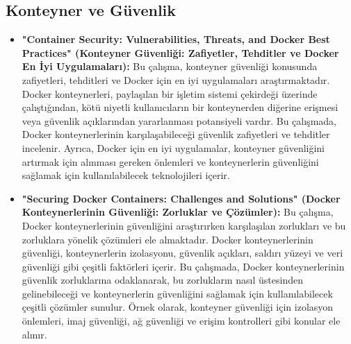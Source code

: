 \subsection{Konteyner ve Güvenlik}
\begin{itemize}
\item \textbf{ "Container Security: Vulnerabilities, Threats, and Docker Best Practices" (Konteyner Güvenliği: Zafiyetler, Tehditler ve Docker En İyi Uygulamaları):}
Bu çalışma, konteyner güvenliği konusunda zafiyetleri, tehditleri ve Docker için en iyi uygulamaları araştırmaktadır. Docker konteynerleri, paylaşılan bir işletim sistemi çekirdeği üzerinde çalıştığından, kötü niyetli kullanıcıların bir konteynerden diğerine erişmesi veya güvenlik açıklarından yararlanması potansiyeli vardır. Bu çalışmada, Docker konteynerlerinin karşılaşabileceği güvenlik zafiyetleri ve tehditler incelenir. Ayrıca, Docker için en iyi uygulamalar, konteyner güvenliğini artırmak için alınması gereken önlemleri ve konteynerlerin güvenliğini sağlamak için kullanılabilecek teknolojileri içerir.\\
\item \textbf{"Securing Docker Containers: Challenges and Solutions" (Docker Konteynerlerinin Güvenliği: Zorluklar ve Çözümler):}
 Bu çalışma, Docker konteynerlerinin güvenliğini araştırırken karşılaşılan zorlukları ve bu zorluklara yönelik çözümleri ele almaktadır. Docker konteynerlerinin güvenliği, konteynerlerin izolasyonu, güvenlik açıkları, saldırı yüzeyi ve veri güvenliği gibi çeşitli faktörleri içerir. Bu çalışmada, Docker konteynerlerinin güvenlik zorluklarına odaklanarak, bu zorlukların nasıl üstesinden gelinebileceği ve konteynerlerin güvenliğini sağlamak için kullanılabilecek çeşitli çözümler sunulur. Örnek olarak, konteyner güvenliği için izolasyon önlemleri, imaj güvenliği, ağ güvenliği ve erişim kontrolleri gibi konular ele alınır.
\end{itemize}
   